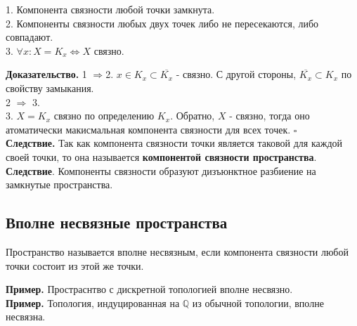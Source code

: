 \begin{theor}
1. Компонента связности любой точки замкнута.\\
2. Компоненты связности любых двух точек либо не пересекаются, либо 
совпадают.\\
3. $\forall x: X=K_x\iff X$ связно.
\end{theor}
\textbf{Доказательство.} 1 $\Rightarrow$2.
$x\in K_x\subset \overline{K_x}$ - связно.
С другой стороны, $\overline{K_x}\subset K_x$ по свойству замыкания.\\
2 $\Rightarrow$ 3. \\
3. $X=K_x$  связно по определению  $K_x$. Обратно,  $X$ - связно, тогда оно
атоматически макисмальная компонента связности для всех точек.
$\square$\\
\textbf{Следствие.} Так как компонента связности точки является таковой для
каждой своей точки, то она называется \textbf{компонентой связности 
пространства}.\\
\textbf{Следствие}. Компоненты связности образуют дизъюнктное разбиение
на замкнутые пространства. 
\subsection{Вполне несвязные пространства}
\begin{defin}
Пространство называется вполне несвязным, если компонента связности любой
точки состоит из этой же точки. 
\end{defin}
\textbf{Пример.} Простраснтво с дискретной топологией вполне несвязно.\\
\textbf{Пример.} Топология, индуцированная на $\mathbb{Q}$ из обычной 
топологии, вполне несвязна. 
